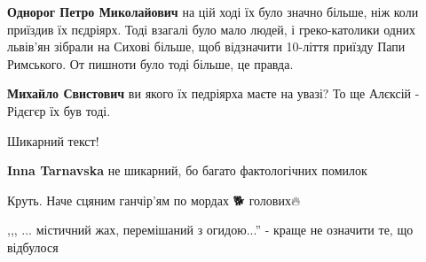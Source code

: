 \begin{itemize}
\begin{itemize}
\textbf{Однорог Петро Миколайович} на цій ході їх було значно більше, ніж коли приїздив їх пєдріярх. Тоді взагалі було мало людей, і греко-католики одних львів'ян зібрали на Сихові більше, щоб відзначити 10-ліття приїзду Папи Римського. От пишноти було тоді більше, це правда.

 
\textbf{Михайло Свистович} ви якого їх педріярха маєте на увазі? То ще Алєксій - Рідєгєр їх був тоді.
\end{itemize}

 
Шикарний текст!

\begin{itemize}
 
\textbf{Inna Tarnavska} не шикарний, бо багато фактологічних помилок
\end{itemize}

 
Круть. Наче сцяним ганчір'ям по мордах 🐕 голових🔥

 
,,, ... містичний жах, перемішаний з огидою...'' - краще не означити те, що відбулося

 


\end{itemize}
